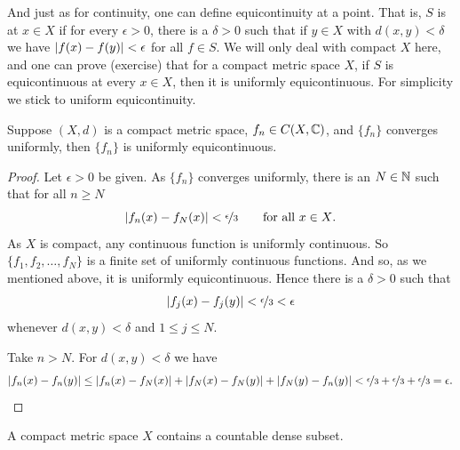And just as for continuity, one can define equicontinuity at a point.
That is, $S$ is \emph{} at $x \in X$
if for every $\epsilon > 0$, there is a $\delta > 0$
such that if $y \in X$ with $d(x,y) < \delta$ we have
$\lvert {f(x)-f(y)} \rvert < \epsilon$ for all $f \in S$.
We will only deal with compact $X$ here, and
one can prove (exercise) that for a compact metric space $X$,
if $S$ is equicontinuous at every $x \in X$,
then it is uniformly equicontinuous.  For simplicity
we stick to uniform equicontinuity.

\begin{prop}
Suppose $(X,d)$ is a compact metric space,
$f_n \in C(X,{\mathbb{C}})$, and $\{ f_n \}$
converges uniformly, then $\{ f_n \}$ is uniformly equicontinuous.
\end{prop}

\begin{proof}
Let $\epsilon > 0$ be given.
As $\{ f_n \}$ converges uniformly, there is an $N \in {\mathbb{N}}$ such that for
all $n \geq N$
\begin{equation*}
\lvert {f_n(x)-f_N(x)} \rvert < \nicefrac{\epsilon}{3} \qquad \text{for all $x \in X$}.
\end{equation*}
As $X$ is compact, any continuous function is uniformly continuous.
So $\{ f_1,f_2,\ldots,f_N \}$ is a finite set of uniformly continuous
functions.  And so, as we mentioned above, it is uniformly equicontinuous.
Hence there is a $\delta > 0$ such that
\begin{equation*}
\lvert {f_j(x)-f_j(y)} \rvert < \nicefrac{\epsilon}{3} < \epsilon
\end{equation*}
whenever $d(x,y) < \delta$ and $1 \leq j \leq N$.

Take $n > N$.  For $d(x,y) < \delta$ we have
\begin{equation*}
\lvert {f_n(x)-f_n(y)} \rvert
\leq
\lvert {f_n(x)-f_N(x)} \rvert
+
\lvert {f_N(x)-f_N(y)} \rvert
+
\lvert {f_N(y)-f_n(y)} \rvert
<
\nicefrac{\epsilon}{3}
+
\nicefrac{\epsilon}{3}
+
\nicefrac{\epsilon}{3}
=\epsilon . \qedhere
\end{equation*}
\end{proof}

\begin{prop}
A compact metric space $X$ contains a countable dense subset.
\end{prop}

